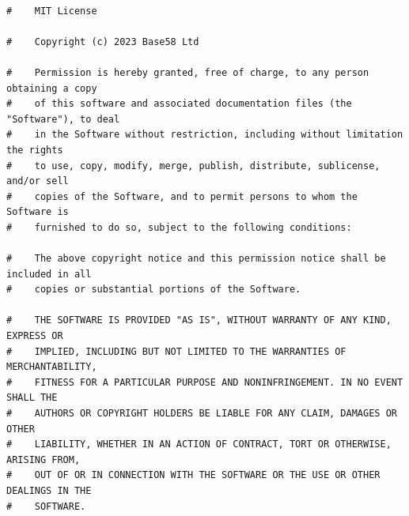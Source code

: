 \documentclass[a4paper,12pt,oneside]{article}
\begin{document}
\begin{lstlisting}

#    MIT License

#    Copyright (c) 2023 Base58 Ltd

#    Permission is hereby granted, free of charge, to any person obtaining a copy
#    of this software and associated documentation files (the "Software"), to deal
#    in the Software without restriction, including without limitation the rights
#    to use, copy, modify, merge, publish, distribute, sublicense, and/or sell
#    copies of the Software, and to permit persons to whom the Software is
#    furnished to do so, subject to the following conditions:

#    The above copyright notice and this permission notice shall be included in all
#    copies or substantial portions of the Software.

#    THE SOFTWARE IS PROVIDED "AS IS", WITHOUT WARRANTY OF ANY KIND, EXPRESS OR
#    IMPLIED, INCLUDING BUT NOT LIMITED TO THE WARRANTIES OF MERCHANTABILITY,
#    FITNESS FOR A PARTICULAR PURPOSE AND NONINFRINGEMENT. IN NO EVENT SHALL THE
#    AUTHORS OR COPYRIGHT HOLDERS BE LIABLE FOR ANY CLAIM, DAMAGES OR OTHER
#    LIABILITY, WHETHER IN AN ACTION OF CONTRACT, TORT OR OTHERWISE, ARISING FROM,
#    OUT OF OR IN CONNECTION WITH THE SOFTWARE OR THE USE OR OTHER DEALINGS IN THE
#    SOFTWARE.


\end{lstlisting}
\end{document}
